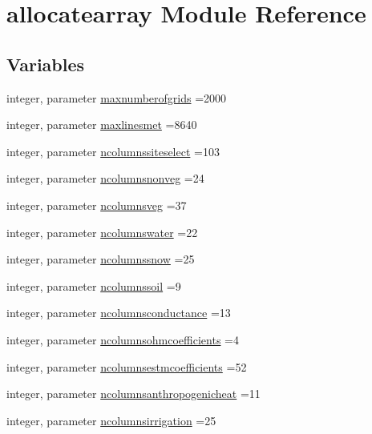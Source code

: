 \hypertarget{namespaceallocatearray}{}\section{allocatearray Module Reference}
\label{namespaceallocatearray}
\subsection*{Variables}
\begin{DoxyCompactItemize}
\item 
integer, parameter \hyperlink{namespaceallocatearray_a45073e6d9fc2dcbf2ca53fceaec41888}{maxnumberofgrids} =2000
\item 
integer, parameter \hyperlink{namespaceallocatearray_af1e1f509de59466fc7517530d095f3c0}{maxlinesmet} =8640
\item 
integer, parameter \hyperlink{namespaceallocatearray_a0fc6d13698e2122d715ea6e5758194d9}{ncolumnssiteselect} =103
\item 
integer, parameter \hyperlink{namespaceallocatearray_a820ebcf66504982dee392a9c3a224fe2}{ncolumnsnonveg} =24
\item 
integer, parameter \hyperlink{namespaceallocatearray_a6b492adaf9d6e5563a21d571d5b8f6ec}{ncolumnsveg} =37
\item 
integer, parameter \hyperlink{namespaceallocatearray_a58f6aaf0837a4d8d3383254237a26732}{ncolumnswater} =22
\item 
integer, parameter \hyperlink{namespaceallocatearray_af347c941e3c24ef04005876d0d351505}{ncolumnssnow} =25
\item 
integer, parameter \hyperlink{namespaceallocatearray_a0e0e9877b1623ca21932a4793c7b8641}{ncolumnssoil} =9
\item 
integer, parameter \hyperlink{namespaceallocatearray_a2830c674e41c46900c1088c40baef680}{ncolumnsconductance} =13
\item 
integer, parameter \hyperlink{namespaceallocatearray_a290704d8211d9850cffa53e494c6821e}{ncolumnsohmcoefficients} =4
\item 
integer, parameter \hyperlink{namespaceallocatearray_ab6963e51ec24ecb58c1ee21fd8a70654}{ncolumnsestmcoefficients} =52
\item 
integer, parameter \hyperlink{namespaceallocatearray_aa1105086801cd6c5c6be1d9563c93341}{ncolumnsanthropogenicheat} =11
\item 
integer, parameter \hyperlink{namespaceallocatearray_ae577fdefdd007ae24a4d46e52bbcd217}{ncolumnsirrigation} =25

\end{DoxyCompactItemize}
